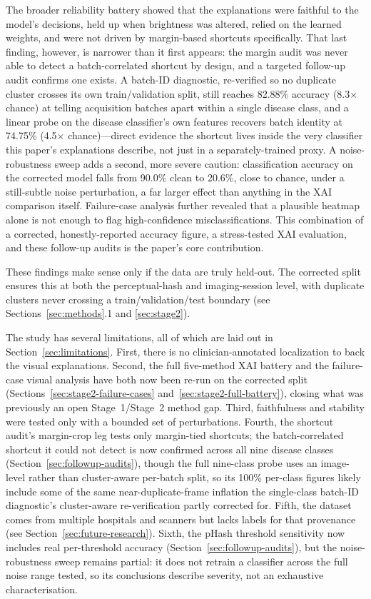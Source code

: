 The broader reliability battery showed that the explanations were faithful to the model's decisions, held up when brightness was altered, relied on the learned weights, and were not driven by margin-based shortcuts specifically. That last finding, however, is narrower than it first appears: the margin audit was never able to detect a batch-correlated shortcut by design, and a targeted follow-up audit confirms one exists. A batch-ID diagnostic, re-verified so no duplicate cluster crosses its own train/validation split, still reaches 82.88\% accuracy (8.3$\times$ chance) at telling acquisition batches apart within a single disease class, and a linear probe on the disease classifier's own features recovers batch identity at 74.75\% (4.5$\times$ chance)---direct evidence the shortcut lives inside the very classifier this paper's explanations describe, not just in a separately-trained proxy. A noise-robustness sweep adds a second, more severe caution: classification accuracy on the corrected model falls from 90.0\% clean to 20.6\%, close to chance, under a still-subtle noise perturbation, a far larger effect than anything in the XAI comparison itself. Failure-case analysis further revealed that a plausible heatmap alone is not enough to flag high-confidence misclassifications. This combination of a corrected, honestly-reported accuracy figure, a stress-tested XAI evaluation, and these follow-up audits is the paper's core contribution.

These findings make sense only if the data are truly held-out. The corrected split ensures this at both the perceptual-hash and imaging-session level, with duplicate clusters never crossing a train/validation/test boundary (see Sections~\ref{sec:methods}.1 and \ref{sec:stage2}).

The study has several limitations, all of which are laid out in Section~\ref{sec:limitations}. First, there is no clinician-annotated localization to back the visual explanations. Second, the full five-method XAI battery and the failure-case visual analysis have both now been re-run on the corrected split (Sections~\ref{sec:stage2-failure-cases} and~\ref{sec:stage2-full-battery}), closing what was previously an open Stage~1/Stage~2 method gap. Third, faithfulness and stability were tested only with a bounded set of perturbations. Fourth, the shortcut audit's margin-crop leg tests only margin-tied shortcuts; the batch-correlated shortcut it could not detect is now confirmed across all nine disease classes (Section~\ref{sec:followup-audits}), though the full nine-class probe uses an image-level rather than cluster-aware per-batch split, so its 100\% per-class figures likely include some of the same near-duplicate-frame inflation the single-class batch-ID diagnostic's cluster-aware re-verification partly corrected for. Fifth, the dataset comes from multiple hospitals and scanners but lacks labels for that provenance (see Section~\ref{sec:future-research}). Sixth, the pHash threshold sensitivity now includes real per-threshold accuracy (Section~\ref{sec:followup-audits}), but the noise-robustness sweep remains partial: it does not retrain a classifier across the full noise range tested, so its conclusions describe severity, not an exhaustive characterisation.
